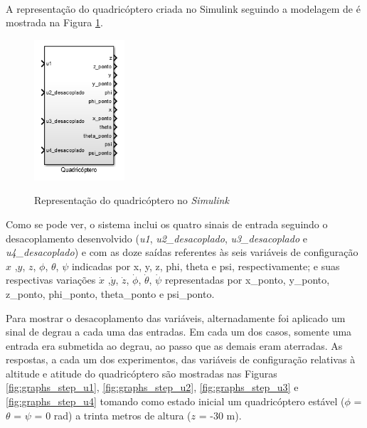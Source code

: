 A representação do quadricóptero criada no Simulink\textsuperscript{\textregistered} seguindo a modelagem de  é mostrada na Figura \ref{fig:diagram_drone_block}. 

\begin{figure}[!htb]
    \centering
    \caption{Representação do quadricóptero no \textit{Simulink}}
    \includegraphics[width=0.3\textwidth]{./04-figuras/figuras_pos_banca/1-mostrando_desacoplamento/diagram_drone_block}
    \label{fig:diagram_drone_block}
\end{figure}
Como se pode ver, o sistema inclui os quatro sinais de entrada seguindo o desacoplamento desenvolvido (\textit{u1}, \textit{u2\_desacoplado}, \textit{u3\_desacoplado} e \textit{u4\_desacoplado}) e com as doze saídas referentes às seis variáveis de configuração $x$ ,$y$, $z$, $\phi$, $\theta$, $\psi$ indicadas por x, y, z, phi, theta e psi, respectivamente; e suas respectivas variações $\dot{x}$ ,$\dot{y}$, $\dot{z}$, $\dot{\phi}$, $\dot{\theta}$, $\dot{\psi}$ representadas por x\_ponto, y\_ponto, z\_ponto, phi\_ponto, theta\_ponto e psi\_ponto.

Para mostrar o desacoplamento das variáveis, alternadamente foi aplicado um sinal de degrau a cada uma das entradas. Em cada um dos casos, somente uma entrada era submetida ao degrau, ao passo que as demais eram aterradas. As respostas, a cada um dos experimentos, das variáveis de configuração relativas à altitude e atitude do quadricóptero são mostradas nas Figuras \ref{fig:graphs_step_u1}, \ref{fig:graphs_step_u2}, \ref{fig:graphs_step_u3} e \ref{fig:graphs_step_u4} tomando como estado inicial um quadricóptero estável ($\phi$ = $\theta$ = $\psi$ = 0 rad) a trinta metros de altura ($z$ = -30 m).

